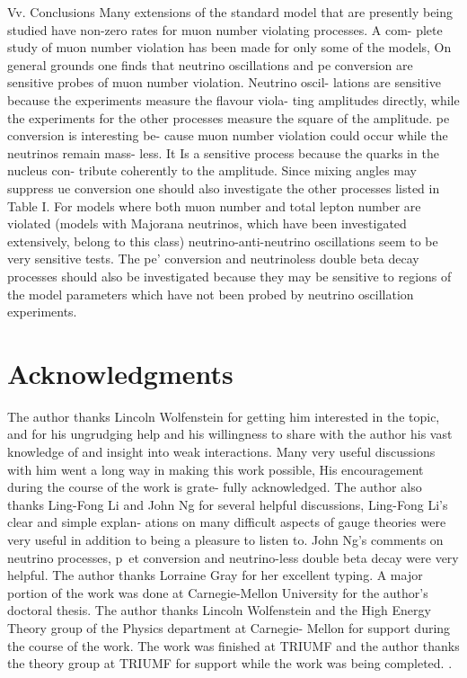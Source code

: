 \documentclass[twoside]{article}
\begin{document}
{{{{{{{{{{{{{{{{Vv. Conclusions
Many extensions of the standard model that are presently being
studied have non-zero rates for muon number violating processes. A com-
plete study of muon number violation has been made for only some of the
models, On general grounds one finds that neutrino oscillations and pe
conversion are sensitive probes of muon number violation. Neutrino oscil-
lations are sensitive because the experiments measure the flavour viola-
ting amplitudes directly, while the experiments for the other processes
measure the square of the amplitude. pe conversion is interesting be-
cause muon number violation could occur while the neutrinos remain mass-
less. It Is a sensitive process because the quarks in the nucleus con-
tribute coherently to the amplitude. Since mixing angles may suppress
ue conversion one should also investigate the other processes listed in
Table I. For models where both muon number and total lepton number are
violated (models with Majorana neutrinos, which have been investigated
extensively, belong to this class) neutrino-anti-neutrino oscillations
seem to be very sensitive tests. The pe’ conversion and neutrinoless
double beta decay processes should also be investigated because they may
be sensitive to regions of the model parameters which have not been
probed by neutrino oscillation experiments.

\section*{Acknowledgments}
The author thanks Lincoln Wolfenstein for getting him interested in
the topic, and for his ungrudging help and his willingness to share with
the author his vast knowledge of and insight into weak interactions.
Many very useful discussions with him went a long way in making this
work possible, His encouragement during the course of the work is grate-
fully acknowledged. The author also thanks Ling-Fong Li and John Ng
for several helpful discussions, Ling-Fong Li's clear and simple explan-
ations on many difficult aspects of gauge theories were very useful in
addition to being a pleasure to listen to. John Ng's comments on neutrino
processes, p~et conversion and neutrino-less double beta decay were very
helpful. The author thanks Lorraine Gray for her excellent typing.
A major portion of the work was done at Carnegie-Mellon University
for the author's doctoral thesis. The author thanks Lincoln Wolfenstein
and the High Energy Theory group of the Physics department at Carnegie-
Mellon for support during the course of the work. The work was finished
at TRIUMF and the author thanks the theory group at TRIUMF for support
while the work was being completed. .


}}}}}}}}}}}}}}}}
\end{document}
